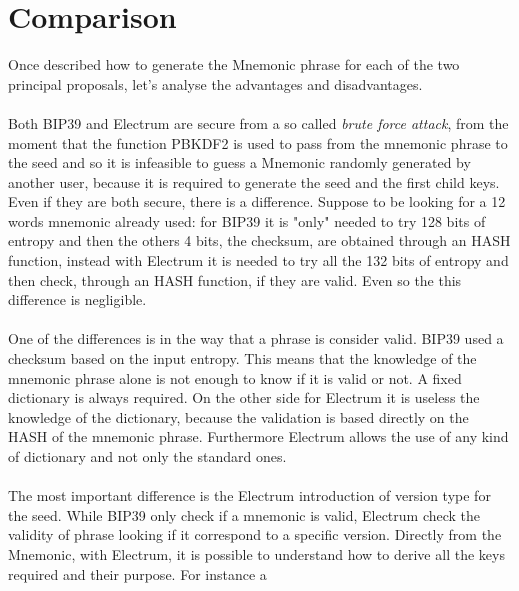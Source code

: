 \section{Comparison}
Once described how to generate the Mnemonic phrase for each of the two principal proposals, let's analyse the advantages and disadvantages.
\\ \\
Both BIP39 and Electrum are secure from a so called \textit{brute force attack}, from the moment that the function PBKDF2 is used to pass from the mnemonic phrase to the seed and so it is infeasible to guess a Mnemonic randomly generated by another user, because it is required to generate the seed and the first child keys. Even if they are both secure, there is a difference. Suppose to be looking for a 12 words mnemonic already used: for BIP39 it is "only" needed to try 128 bits of entropy and then the others 4 bits, the checksum, are obtained through an HASH function, instead with Electrum it is needed to try all the 132 bits of entropy and then check, through an HASH function, if they are valid. Even so the this difference is negligible.
\\ \\ 
One of the differences is in the way that a phrase is consider valid. BIP39 used a checksum based on the input entropy. This means that the knowledge of the mnemonic phrase alone is not enough to know if it is valid or not. A fixed dictionary is always required. On the other side for Electrum it is useless the knowledge of the dictionary, because the validation is based directly on the HASH of the mnemonic phrase. Furthermore Electrum allows the use of any kind of dictionary and not only the standard ones.
\\ \\
The most important difference is the Electrum introduction of version type for the seed. While BIP39 only check if a mnemonic is valid, Electrum check the validity of phrase looking if it correspond to a specific version. Directly from the Mnemonic, with Electrum, it is possible to understand how to derive all the keys required and their purpose. For instance a 


